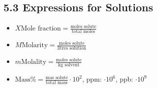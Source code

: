 \subsection{5.3 Expressions for Solutions}
\begin{itemize}
    \item $X \textrm{Mole fraction} = \frac{\textrm{moles solute}}{\textrm{total moles}}$
    \item $M \textrm{Molarity} = \frac{\textrm{moles solute}}{\textrm{litres solution}}$
    \item $m \textrm{Molality} = \frac{\textrm{moles solute}}{\textrm{kg solvent}}$
    \item $\textrm{Mass} \% = \frac{\textrm{mas solute}}{\textrm{total mass}} \cdot 10^2$, ppm: $\cdot 10^6$, ppb: $\cdot 10^9$
\end{itemize}